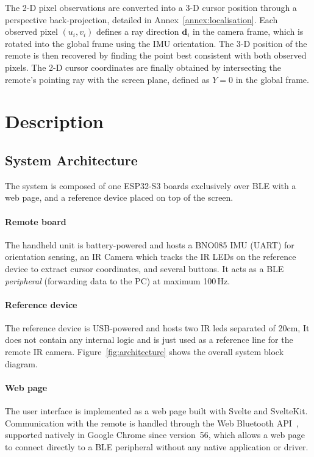 \documentclass[12pt, a4paper]{article}
\begin{document}
The 2-D pixel observations are converted into a 3-D cursor position through a perspective back-projection, detailed in Annex~\ref{annex:localisation}. Each observed pixel $(u_i, v_i)$ defines a ray direction $\mathbf{d}_i$ in the camera frame, which is rotated into the global frame using the IMU orientation. The 3-D position of the remote is then recovered by finding the point best consistent with both observed pixels. The 2-D cursor coordinates are finally obtained by intersecting the remote's pointing ray with the screen plane, defined as $Y = 0$ in the global frame.


\section{Description}



\subsection{System Architecture}

The system is composed of one ESP32-S3 boards exclusively over BLE with a web page, and a reference device placed on top of the screen.

\paragraph{Remote board} The handheld unit is battery-powered and hosts a BNO085 IMU (UART) for orientation sensing, an IR Camera which tracks the IR LEDs on the reference device to extract cursor coordinates, and several buttons. It acts as a BLE \textit{peripheral} (forwarding data to the PC) at maximum 100\,Hz.

\paragraph{Reference device} The reference device is USB-powered and hosts two IR leds separated of 20cm,  It does not contain any internal logic and is just used as a reference line for the remote IR camera. 
Figure~\ref{fig:architecture} shows the overall system block diagram.

\paragraph{Web page}
The user interface is implemented as a web page built with Svelte and SvelteKit. Communication with the remote is handled through the Web Bluetooth API~\cite{chrome_bluetooth}, supported natively in Google Chrome since version~56, which allows a web page to connect directly to a BLE peripheral without any native application or driver.
\end{document}
